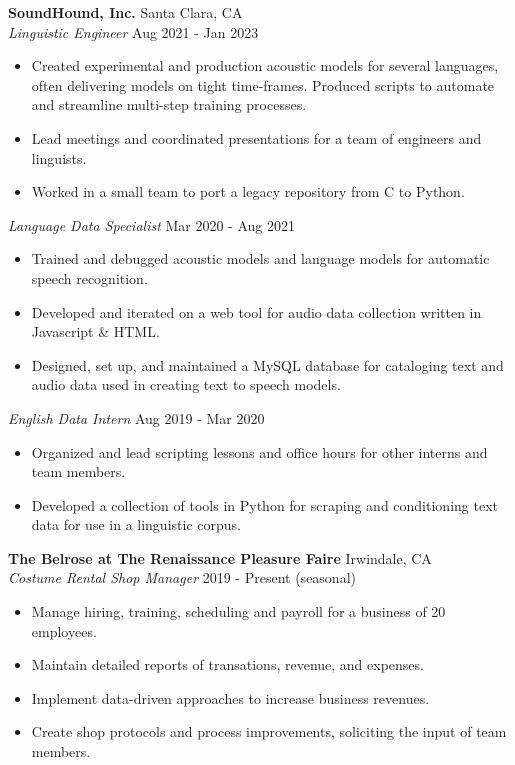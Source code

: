 \documentclass[]{article}
\begin{document}
	
	\textbf{SoundHound, Inc.} \hfill Santa Clara, CA\\
	\textit{Linguistic Engineer} \hfill Aug 2021 - Jan 2023\\
	\vspace{-3mm}
	\begin{itemize} \itemsep 0pt
		\item Created experimental and production acoustic models for several languages, often delivering models on tight time-frames.  Produced scripts to automate and streamline multi-step training processes.
		\item Lead meetings and coordinated presentations for a team of engineers and linguists.
		\item Worked in a small team to port a legacy repository from C to Python. 
	\end{itemize}
	\vspace{-2mm}
	\textit{Language Data Specialist} \hfill Mar 2020 - Aug 2021\\
	\vspace{-3mm}
	\begin{itemize} \itemsep 0pt
		\item Trained and debugged acoustic models and language models for automatic speech recognition.  
		\item Developed and iterated on a web tool for audio data collection written in Javascript \& HTML.
		\item Designed, set up, and maintained a MySQL database for cataloging text and audio data used in creating text to speech models.
	\end{itemize}
	\vspace{-2mm}
	\textit{English Data Intern} \hfill Aug 2019 - Mar 2020\\
	\vspace{-3mm}
	\begin{itemize} \itemsep 0pt
		\item Organized and lead scripting lessons and office hours for other interns and team members.
		\item Developed a collection of tools in Python for scraping and conditioning text data for use in a linguistic corpus.
	\end{itemize}
	
	\textbf{The Belrose at The Renaissance Pleasure Faire} \hfill Irwindale, CA\\
	\textit{Costume Rental Shop Manager} \hfill 2019 - Present (seasonal)\\
	\vspace{-3mm}
	\begin{itemize} \itemsep 0pt
		\item Manage hiring, training, scheduling and payroll for a business of 20 employees.
		\item Maintain detailed reports of transations, revenue, and expenses.
		\item Implement data-driven approaches to increase business revenues.
		\item Create shop protocols and process improvements, soliciting the input of team members. 
	\end{itemize}
	\vspace{1mm}
	
\end{document}
